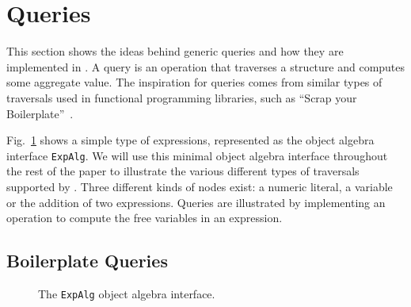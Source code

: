 \section{Queries}\label{sec:queries}

This section shows the ideas behind generic queries and how they are
implemented in \Name.  A query is an operation that traverses a
structure and computes some aggregate value. The inspiration for
queries comes from similar types of traversals used in functional
programming libraries, such as ``Scrap your
Boilerplate''~\cite{ralf03syb}.


Fig.~\ref{exp_alg} shows a simple type of expressions, represented
as the object algebra interface \lstinline{ExpAlg}. We will use this
minimal object algebra interface throughout the rest of the paper to
illustrate the various different types of traversals supported by
\Name.  Three different kinds of nodes exist: a numeric literal, a
variable or the addition of two expressions. Queries are illustrated
by implementing an operation to compute the free variables in an expression.

\begin{comment}
As a specific type of object algebras, queries allow users to define
new operations handling a user-defined data structure\bruno{This
  definition of queries is just too broad. Please
look at papers like Syb to see how they describe queries and transformations}. A \textit{query
  algebra} is a class implementing an object algebra interface by a
top-down traversal throughout the hierarchy. It is something
supporting the program to gather information from the substructures of
a data type recursively, and make a response at the root node to the
query.
\end{comment}

\subsection{Boilerplate Queries}\label{subsec:freevars}

\begin{figure}[t]
\nocaptionrule
\caption{The \lstinline{ExpAlg} object algebra interface.}
\label{exp_alg}
\end{figure}

